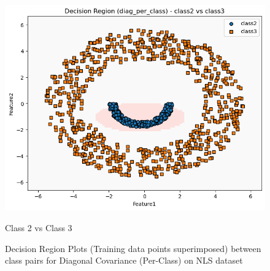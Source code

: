 \begin{figure}[H]
    \hfill
    \begin{minipage}{0.32\linewidth}
        \includegraphics[width=\linewidth]{images/NLS_Group04_images/03_diag_per_class/04_decision_region_c2_c3.png}
        \caption*{Class 2 vs Class 3}
    \end{minipage}
    \caption{Decision Region Plots (Training data points superimposed) between class pairs for Diagonal Covariance (Per-Class) on NLS dataset}
\end{figure}